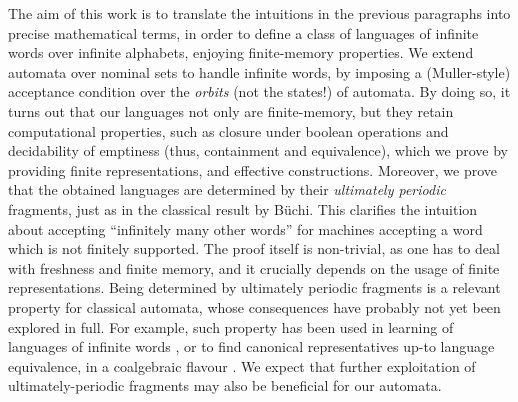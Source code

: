 The aim of this work is to translate the intuitions in the previous paragraphs into precise mathematical terms, in order to define a class of languages of infinite words over infinite alphabets, enjoying finite-memory properties. We extend automata over nominal sets to handle infinite words, by imposing a (Muller-style) acceptance condition 
over the \emph{orbits} (not the states!) of automata. By doing so, it turns out that our languages not only are finite-memory, but they retain computational properties, such as closure under boolean operations and decidability of emptiness (thus, containment and equivalence), which we prove by providing finite representations, and effective constructions. Moreover, we prove that the obtained languages are determined by their \emph{ultimately periodic} fragments, just as in the classical result by B\"uchi. %
This clarifies the intuition about accepting ``infinitely many other words'' for machines accepting a word which is not finitely supported. 
%
The proof itself is non-trivial, as one has to deal with freshness and finite memory, and it crucially depends on the usage of finite representations.
Being determined by ultimately periodic fragments is
a relevant property for classical automata, whose consequences have probably not yet been explored in full.
%
For example, such property has been used in learning of languages of infinite words \cite{FCCTW08}, or to find canonical representatives up-to language equivalence, in a coalgebraic flavour \cite{CV12}. We expect that further exploitation of ultimately-periodic fragments may also be beneficial for 
our automata.%




